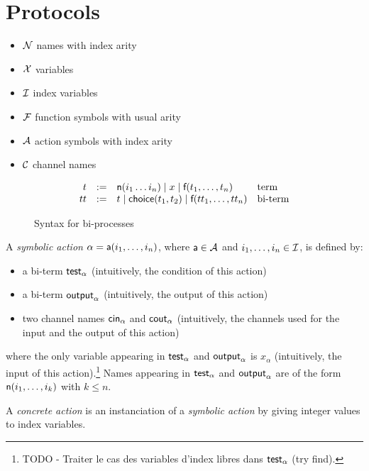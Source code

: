 \section{Protocols}

\begin{itemize}
  \item $\mathcal{N}$ names with index arity
  \item $\mathcal{X}$ variables
  \item $\mathcal{I}$ index variables
  \item $\mathcal{F}$ function symbols with usual arity
  \item $\mathcal{A}$ action symbols with index arity
  \item $\mathcal{C}$ channel names
\end{itemize}

\begin{figure}[h]
  \[
    \begin{array}{rcll}
      t & := & \textsf{n}(i_1 \dots i_n) \mid x \mid \textsf{f}(t_1,\dots,t_n) & \text{term}
      \\
      tt & := & t \mid \mathsf{choice}(t_1,t_2) \mid \textsf{f}(tt_1,\dots,tt_n) & \text{bi-term}
    \end{array}
  \]
  \caption{Syntax for bi-processes}
  \label{fig:syntax-bi-process}
\end{figure}

\begin{definition}
A \emph{symbolic action} $\alpha = \textsf{a}(i_1,\dots,i_n)$, where $\textsf{a} \in \mathcal{A}$ and $i_1,\dots,i_n \in \mathcal{I}$, is defined by:
\begin{itemize}
  \item a bi-term $\textsf{test}_{\alpha}$ (intuitively, the condition of this action)
  \item a bi-term $\textsf{output}_{\alpha}$ (intuitively, the output of this action)
  \item two channel names $\mathsf{cin}_\alpha$ and $\mathsf{cout}_\alpha$ (intuitively, the channels used for the input and the output of this action)
\end{itemize}
where the only variable appearing in $\textsf{test}_{\alpha}$ and $\textsf{output}_{\alpha}$ is $x_{\alpha}$ (intuitively, the input of this action).\footnote{TODO - Traiter le cas des variables d'index libres dans $\textsf{test}_{\alpha}$ (try find).}
Names appearing in $\textsf{test}_{\alpha}$ and $\textsf{output}_{\alpha}$ are of the form $\textsf{n}(i_1,\dots,i_k)$ with $k \leq n$.
\end{definition}

\begin{definition}
A \emph{concrete action} is an instanciation of a \emph{symbolic action} by giving integer values to index variables.
\end{definition}

